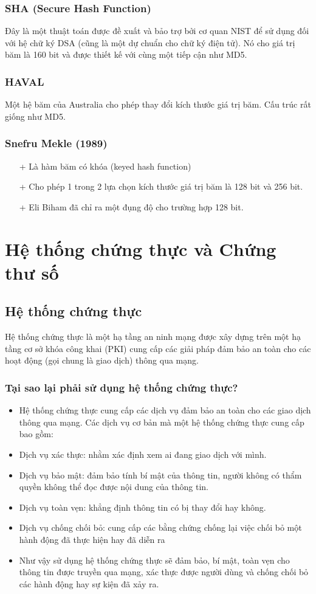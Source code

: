 \documentclass[a4paper,12pt]{report}
\begin{document}
\subsubsection{SHA (Secure Hash Function)}
Đây là một thuật toán được đề xuất và bảo trợ bởi cơ quan NIST để sử dụng đối với hệ chữ ký DSA (cũng là một dự chuẩn cho chữ ký điện tử). Nó cho giá trị băm là 160 bit và được thiết kế với cùng một tiếp cận như MD5.
\subsubsection{HAVAL}
Một hệ băm của Australia cho phép thay đổi kích thước giá trị băm. Cấu trúc rất giống như MD5.
\subsubsection{Snefru Mekle (1989)}
\begin{itemize}
\item[+] Là hàm băm có khóa (keyed hash function)
\item[+] Cho phép 1 trong 2 lựa chọn kích thước giá trị băm là 128 bit và 256 bit.
\item[+] Eli Biham đã chỉ ra một đụng độ cho trường hợp 128 bit.
\end{itemize}
\section{Hệ thống chứng thực và Chứng thư số}
\subsection*{Hệ thống chứng thực}
Hệ thống chứng thực là một hạ tầng an ninh mạng được xây dựng trên một hạ tầng cơ sở khóa công khai (PKI) cung cấp các giải pháp đảm bảo an toàn cho các hoạt động (gọi chung là giao dịch) thông qua mạng.
\subsubsection{Tại sao lại phải sử dụng hệ thống chứng thực?}
\begin{itemize}
\item Hệ thống chứng thực cung cấp các dịch vụ đảm bảo an toàn cho các giao dịch thông qua mạng. Các dịch vụ cơ bản mà một hệ thống chứng thực cung cấp bao gồm:
\item Dịch vụ xác thực: nhằm xác định xem ai đang giao dịch với mình.
\item Dịch vụ bảo mật: đảm bảo tính bí mật của thông tin, người không có thẩm quyền không thể đọc được nội dung của thông tin.
\item Dịch vụ toàn vẹn: khẳng định thông tin có bị thay đổi hay không.
\item Dịch vụ chống chối bỏ: cung cấp các bằng chứng chống lại việc chối bỏ một hành động đã thực hiện hay đã diễn ra
\item Như vậy sử dụng hệ thống chứng thực sẽ đảm bảo, bí mật, toàn vẹn cho thông tin được truyền qua mạng, xác thực được người dùng và chống chối bỏ các hành động hay sự kiện đã xảy ra.
\end{itemize}
\end{document}
